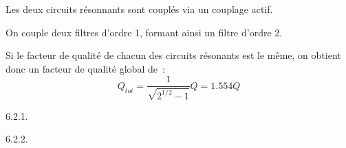 \documentclass{article}
\begin{document}

Les deux circuits résonnants sont couplés via un couplage actif.


On couple deux filtres d'ordre 1, formant ainsi un filtre d'ordre 2.

Si le facteur de qualité de chacun des circuits résonants est le même, on obtient donc un facteur de qualité global de~:
\begin{equation*}
Q_{tot} = \frac{1}{\sqrt{2^{1/2}-1}}Q = 1.554 Q
\end{equation*}






6.2.1. %

6.2.2. %
\end{document}
